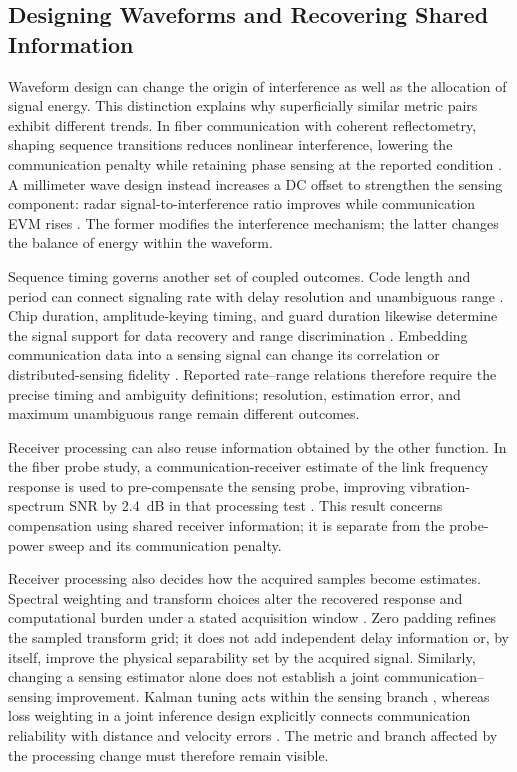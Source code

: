 \subsection{Designing Waveforms and Recovering Shared Information}

Waveform design can change the origin of interference as well as the allocation
of signal energy. This distinction explains why superficially similar metric
pairs exhibit different trends. In fiber communication with coherent
reflectometry, shaping sequence transitions reduces nonlinear interference,
lowering the communication penalty while retaining phase sensing at the
reported condition \cite{OISAC_SCR00052}. A millimeter wave design instead
increases a DC offset to strengthen the sensing component: radar
signal-to-interference ratio improves while communication EVM rises
\cite{OISAC_SCR00808}. The former modifies the interference mechanism; the
latter changes the balance of energy within the waveform.

Sequence timing governs another set of coupled outcomes. Code length and
period can connect signaling rate with delay resolution and unambiguous range
\cite{OISAC_SCR00896,OISAC_SCR00576}. Chip duration, amplitude-keying timing,
and guard duration likewise determine the signal support for data recovery and
range discrimination \cite{OISAC_SCR00387,OISAC_SCR00887,OISAC_SCR00913}.
Embedding communication data into a sensing signal can change its correlation
or distributed-sensing fidelity \cite{OISAC_SCR00647,OISAC_SCR00918}.
Reported rate--range relations therefore require the precise timing and
ambiguity definitions; resolution, estimation error, and maximum unambiguous
range remain different outcomes.

Receiver processing can also reuse information obtained by the other function.
In the fiber probe study, a communication-receiver estimate of the link
frequency response is used to pre-compensate the sensing probe, improving
vibration-spectrum SNR by 2.4~dB in that processing test
\cite{OISAC_SCR00057}. This result concerns compensation using shared receiver
information; it is separate from the probe-power sweep and its communication
penalty.

Receiver processing also decides how the acquired samples become estimates. Spectral
weighting and transform choices alter the recovered response and computational
burden under a stated acquisition window
\cite{OISAC_SCR00998,OISAC_SCR01018,OISAC_SCR01095}. Zero padding refines the
sampled transform grid; it does not add independent delay information or,
by itself, improve the physical separability set by the acquired signal.
Similarly, changing a sensing estimator alone does not establish a joint
communication--sensing improvement. Kalman tuning acts within the sensing
branch \cite{OISAC_SCR00665}, whereas loss weighting in a joint inference
design explicitly connects communication reliability with distance and velocity
errors \cite{OISAC_SCR00233}. The metric and branch affected by the processing
change must therefore remain visible.

